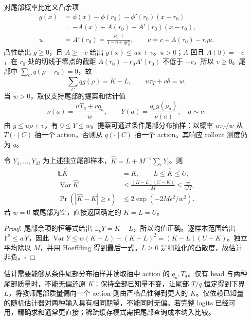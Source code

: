 \documentclass[lang=cn,scheme=chinese,openany]{../book/elegantbook}
\newcommand{\E}{\mathbb E}
\newcommand{\Var}{\operatorname{Var}}
\begin{document}
对尾部概率比定义凸余项
\begin{align}
 g(x)&=\phi(x)-\phi(r_0)-\phi'(r_0)(x-r_0)\\
 &=-A(x)+A(r_0)+A'(r_0)(x-r_0),\\
 u&=A'(r_0)=\frac{r_0^{\kappa-1}}{1-\eta+\eta r_0^\kappa},\qquad
 v=c+A(r_0)-r_0u.
\end{align}
凸性给出 $g\ge0$，且 $A\ge-c$ 给出 $g(x)\le ux+v$。$u>0$；$A$ 凹且 $A(0)=-c$，在 $r_0$ 处的切线于零点的截距 $A(r_0)-r_0A'(r_0)$ 不低于 $-c$，所以 $v\ge0$。尾部中 $\sum_Cq(\rho-r_0)=0$，故
\begin{equation}
 \sum_Cqg(\rho)=K-L,\qquad u\tau_T+v\delta=w.
\end{equation}
当 $w>0$，取仅支持尾部的提案和估计值
\begin{equation}
 \nu(a)=\frac{uT_a+vq_a}{w},\qquad
 Y(a)=\frac{q_ag(\rho_a)}{\nu(a)},\quad a\sim\nu.
\end{equation}
由 $g\le u\rho+v$，有 $0\le Y\le w$。提案可通过条件尾部分布抽样：以概率 $u\tau_T/w$ 从 $T(\cdot\mid C)$ 抽一个 action，否则从 $q(\cdot\mid C)$ 抽一个 action。其响应 rollout 测度仍为 $q$。

\begin{theorem}[区间内的无偏教师中心估计]
\label{thm:center-tail-bounded-estimator}
令 $Y_1,\ldots,Y_M$ 为上述独立尾部样本，$\widehat K=L+M^{-1}\sum_iY_i$。则
\begin{align}
 \E\widehat K&=K,\qquad L\le\widehat K\le U,\\
 \Var\widehat K&\le\frac{(K-L)(U-K)}M\le\frac{w^2}{4M},\\
 \Pr(|\widehat K-K|\ge\epsilon)&\le2\exp(-2M\epsilon^2/w^2).
\end{align}
若 $w=0$ 或尾部为空，直接返回确定的 $K=L=U$。
\end{theorem}

\begin{proof}
尾部余项的恒等式给出 $\E_\nu Y=K-L$，所以均值正确。逐样本范围给出 $Y^2\le wY$，因此 $\Var Y\le w(K-L)-(K-L)^2=(K-L)(U-K)$。独立平均除以 $M$，并用 Hoeffding 得到最后一式。$L\ge0$ 是粗粒化的凸散度，故估计非负。\hfill$\square$
\end{proof}

估计需要能够从条件尾部分布抽样并读取抽中 action 的 $q_a,T_a$。仅有 head 与两种尾部质量时，不能无偏还原 $K$：保持全部已知量不变，让尾部 $T/q$ 恒定得到下界 $L$，将教师尾部质量偏向一个 action 则由严格凸性得到更大的 $K$。仅依赖已知量的随机估计器对两种输入具有相同期望，不能同时无偏。若完整 logits 已经可用，精确求和通常更直接；稀疏缓存模式需把尾部查询成本纳入比较。
\end{document}
